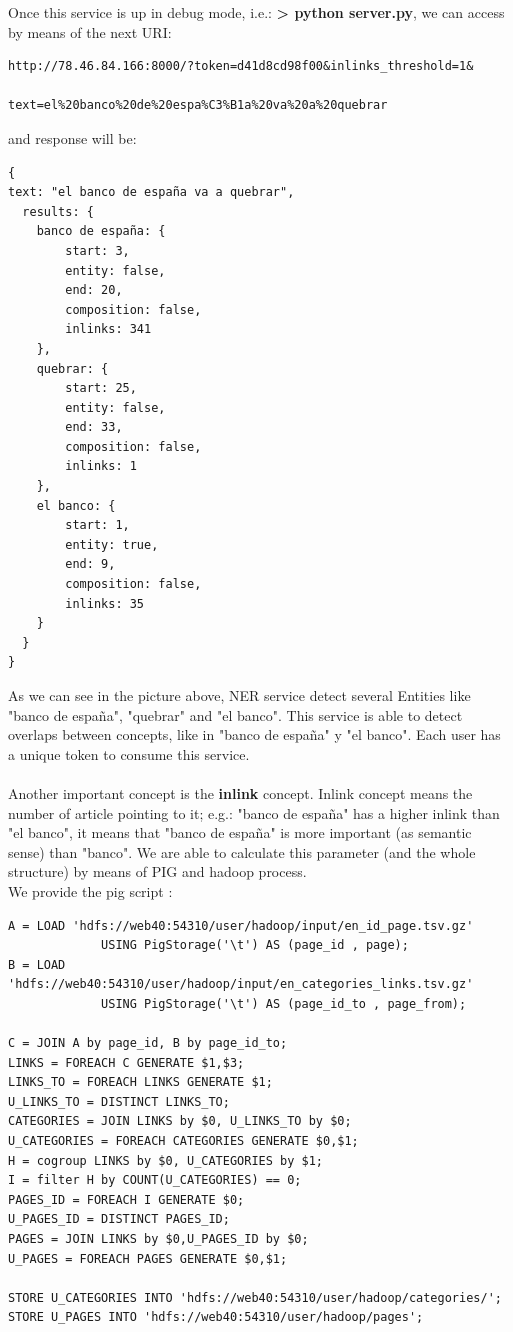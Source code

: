 \documentclass[a4paper,11pt]{article}
\begin{document}
Once this service is up in debug mode, i.e.: {\bf > python server.py}, we can access by means of the next URI:
\begin{verbatim}
http://78.46.84.166:8000/?token=d41d8cd98f00&inlinks_threshold=1&
                       text=el%20banco%20de%20espa%C3%B1a%20va%20a%20quebrar
\end{verbatim}
and response will be:
\begin{verbatim}
{
text: "el banco de españa va a quebrar",
  results: {
    banco de españa: {
        start: 3,
        entity: false,
        end: 20,
        composition: false,
        inlinks: 341
    },
    quebrar: {
        start: 25,
        entity: false,
        end: 33,
        composition: false,
        inlinks: 1
    },
    el banco: {
        start: 1,
        entity: true,
        end: 9,
        composition: false,
        inlinks: 35
    }
  }  
}
\end{verbatim}
As we can see in the picture above, NER service detect several Entities like "banco de españa", "quebrar" and "el banco". This service is able to detect overlaps between concepts, like in "banco de españa" y "el banco". Each user has a unique token to consume this service.
\\
\\
Another important concept is the {\bf inlink} concept. Inlink concept means the number of article pointing to it; e.g.: "banco de españa" has a higher inlink than "el banco", it means that "banco de españa" is more important (as semantic sense) than "banco". We are able to calculate this parameter (and the whole structure) by means of PIG and hadoop process.
\\ We provide the pig script :
\\
\begin{verbatim}
A = LOAD 'hdfs://web40:54310/user/hadoop/input/en_id_page.tsv.gz' 
             USING PigStorage('\t') AS (page_id , page);
B = LOAD 'hdfs://web40:54310/user/hadoop/input/en_categories_links.tsv.gz' 
             USING PigStorage('\t') AS (page_id_to , page_from);

C = JOIN A by page_id, B by page_id_to;
LINKS = FOREACH C GENERATE $1,$3;
LINKS_TO = FOREACH LINKS GENERATE $1;
U_LINKS_TO = DISTINCT LINKS_TO;
CATEGORIES = JOIN LINKS by $0, U_LINKS_TO by $0;
U_CATEGORIES = FOREACH CATEGORIES GENERATE $0,$1;
H = cogroup LINKS by $0, U_CATEGORIES by $1;
I = filter H by COUNT(U_CATEGORIES) == 0;
PAGES_ID = FOREACH I GENERATE $0;
U_PAGES_ID = DISTINCT PAGES_ID;
PAGES = JOIN LINKS by $0,U_PAGES_ID by $0;
U_PAGES = FOREACH PAGES GENERATE $0,$1;

STORE U_CATEGORIES INTO 'hdfs://web40:54310/user/hadoop/categories/';
STORE U_PAGES INTO 'hdfs://web40:54310/user/hadoop/pages';
\end{verbatim}
\end{document}
